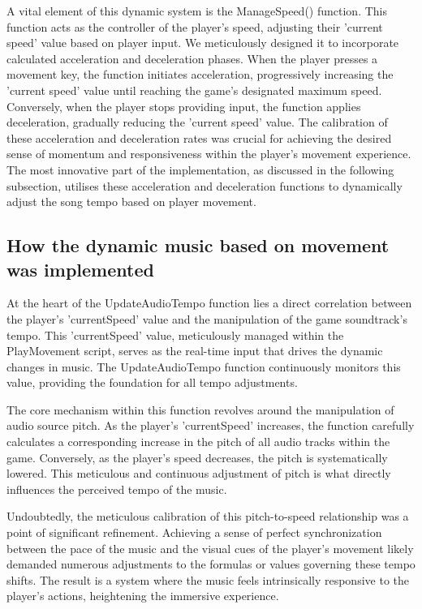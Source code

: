 \documentclass{l4proj}
\begin{document}
A vital element of this dynamic system is the ManageSpeed() function. This function acts as the controller of the player's speed, adjusting their 'current speed' value based on player input. We meticulously designed it to incorporate calculated acceleration and deceleration phases. When the player presses a movement key, the function initiates acceleration, progressively increasing the 'current speed' value until reaching the game's designated maximum speed. Conversely, when the player stops providing input, the function applies deceleration, gradually reducing the 'current speed' value. The calibration of these acceleration and deceleration rates was crucial for achieving the desired sense of momentum and responsiveness within the player's movement experience. The most innovative part of the implementation, as discussed in the following subsection, utilises these acceleration and deceleration functions to dynamically adjust the song tempo based on player movement.

\subsection{How the dynamic music based on movement was implemented}
At the heart of the UpdateAudioTempo function lies a direct correlation between the player's 'currentSpeed' value and the manipulation of the game soundtrack's tempo.  This 'currentSpeed' value, meticulously managed within the PlayMovement script, serves as the real-time input that drives the dynamic changes in music.  The UpdateAudioTempo function continuously monitors this value, providing the foundation for all tempo adjustments.

The core mechanism within this function revolves around the manipulation of audio source pitch.  As the player's 'currentSpeed' increases, the function carefully calculates a corresponding increase in the pitch of all audio tracks within the game.  Conversely, as the player's speed decreases, the pitch is systematically lowered.  This meticulous and continuous adjustment of pitch is what directly influences the perceived tempo of the music.

Undoubtedly, the meticulous calibration of this pitch-to-speed relationship was a point of significant refinement.  Achieving a sense of perfect synchronization between the pace of the music and the visual cues of the player's movement likely demanded numerous adjustments to the formulas or values governing these tempo shifts.  The result is a system where the music feels intrinsically responsive to the player's actions, heightening the immersive experience.
\end{document}
